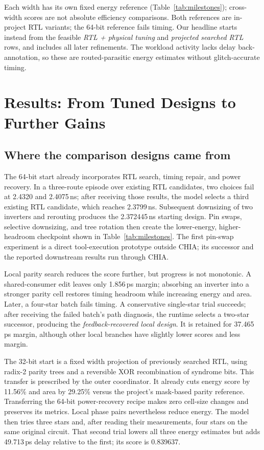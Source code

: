 \documentclass[conference,10pt]{IEEEtran}
\begin{document}
Each width has its own fixed energy reference (Table~\ref{tab:milestones}); cross-width scores are not absolute efficiency comparisons. Both references are in-project RTL variants; the 64-bit reference fails timing. Our headline starts instead from the feasible \emph{RTL + physical tuning} and \emph{projected searched RTL} rows, and includes all later refinements. The workload activity lacks delay back-annotation, so these are routed-parasitic energy estimates without glitch-accurate timing.


\section{Results: From Tuned Designs to Further Gains}
\subsection{Where the comparison designs came from}

The 64-bit start already incorporates RTL search, timing repair, and power recovery. In a three-route episode over existing RTL candidates, two choices fail at 2.4320 and 2.4075\,ns; after receiving those results, the model selects a third existing RTL candidate, which reaches 2.3799\,ns. Subsequent downsizing of two inverters and rerouting produces the 2.372445\,ns starting design. Pin swaps, selective downsizing, and tree rotation then create the lower-energy, higher-headroom checkpoint shown in Table~\ref{tab:milestones}. The first pin-swap experiment is a direct tool-execution prototype outside CHIA; its successor and the reported downstream results run through CHIA.

Local parity search reduces the score further, but progress is not monotonic. A shared-consumer edit leaves only 1.856\,ps margin; absorbing an inverter into a stronger parity cell restores timing headroom while increasing energy and area. Later, a four-star batch fails timing. A conservative single-star trial succeeds; after receiving the failed batch's path diagnosis, the runtime selects a two-star successor, producing the \emph{feedback-recovered local design}. It is retained for 37.465\,ps margin, although other local branches have slightly lower scores and less margin.

The 32-bit start is a fixed width projection of previously searched RTL, using radix-2 parity trees and a reversible XOR recombination of syndrome bits. This transfer is prescribed by the outer coordinator. It already cuts energy score by 11.56\% and area by 29.25\% versus the project's mask-based parity reference. Transferring the 64-bit power-recovery recipe makes zero cell-size changes and preserves its metrics. Local phase pairs nevertheless reduce energy. The model then tries three stars and, after reading their measurements, four stars on the same original circuit. That second trial lowers all three energy estimates but adds 49.713\,ps delay relative to the first; its score is 0.839637.
\end{document}
